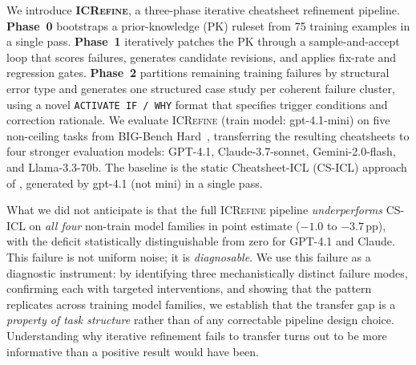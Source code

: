 \documentclass{article}
\begin{document}
We introduce \textbf{\textsc{ICRefine}}, a three-phase iterative cheatsheet refinement
pipeline.
\textbf{Phase~0} bootstraps a prior-knowledge (PK) ruleset from 75 training examples in a
single pass.
\textbf{Phase~1} iteratively patches the PK through a sample-and-accept loop that scores
failures, generates candidate revisions, and applies fix-rate and regression gates.
\textbf{Phase~2} partitions remaining training failures by structural error type and
generates one structured case study per coherent failure cluster, using a novel
\texttt{ACTIVATE~IF\,/\,WHY} format that specifies trigger conditions and correction
rationale.
We evaluate \textsc{ICRefine} (train model: gpt-4.1-mini) on five non-ceiling tasks from
BIG-Bench Hard~\citep{bbh}, transferring the resulting cheatsheets to four stronger
evaluation models: GPT-4.1, Claude-3.7-sonnet, Gemini-2.0-flash, and Llama-3.3-70b.
The baseline is the static Cheatsheet-ICL (CS-ICL) approach of \citet{csicl2024},
generated by gpt-4.1 (not mini) in a single pass.

What we did not anticipate is that the full \textsc{ICRefine} pipeline
\emph{underperforms} CS-ICL on \emph{all four} non-train model families in point estimate ($-1.0$ to $-3.7$\,pp),
with the deficit statistically distinguishable from zero for GPT-4.1 and Claude.
This failure is not uniform noise; it is \emph{diagnosable}.
We use this failure as a diagnostic instrument: by identifying three mechanistically distinct
failure modes, confirming each with targeted interventions, and showing that the pattern replicates
across training model families, we establish that the transfer gap is a \emph{property of task
structure} rather than of any correctable pipeline design choice.
Understanding why iterative refinement fails to transfer turns out to be more informative
than a positive result would have been.
\end{document}
